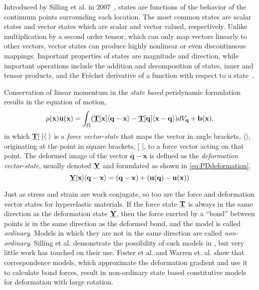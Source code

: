 \documentclass[11pt]{amsart}
\newcommand\vstate[3]{%
	\mathbf{\underline{#1}}%
	\ifstrempty{#2}{}{[#2]}%
	\ifstrempty{#3}{}{\langle #3 \rangle}}
\begin{document}
Introduced by Silling et al. in 2007~\cite{silling2007peridynamic}, states are functions of the behavior of the continuum points surrounding each location.
The most common states are scalar states and vector states which are scalar and vector valued, respectively.
Unlike multiplication by a second order tensor, which can only map vectors linearly to other vectors, vector states can produce highly nonlinear or even discontinuous mappings.
Important properties of states are magnitude and direction, while important operations include the addition and decomposition of states, inner and tensor products, and the Fr\'{e}chet derivative of a function with respect to a state~\cite{silling2007peridynamic}.

Conservation of linear momentum in the \textit{state based} peridynamic formulation results in the equation of motion,
%
\begin{equation}
\label{eq:PDstateEoM}
\rho(\mathbf{x})\ddot{\mathbf{u}}(\mathbf{x}) = \int_\Omega (\vstate{T}{\mathbf{x}}{\mathbf{q}-\mathbf{x}}-\vstate{T}{\mathbf{q}}{\mathbf{x}-\mathbf{q}}) dV_\mathbf{q}  + \mathbf{b}(\mathbf{x}),\notag
\end{equation}
%
in which $\vstate{T}{\;}{\;}$ is a \textit{force vector-state} that maps the vector in angle brackets, $\langle \rangle$, originating at the point in square brackets, [ ], to a force vector acting on that point.
The deformed image of the vector $\mathbf{q}-\mathbf{x}$ is defined as the \textit{deformation vector-state}, usually denoted $\vstate{Y}{}{}$ and formulated as shown in \cref{eq:PDdeformation}. 
%
\begin{equation}
\label{eq:PDdeformation}
\vstate{Y}{\mathbf{x}}{\mathbf{q}-\mathbf{x}} = (\mathbf{q}-\mathbf{x}) + (\mathbf{u}(\mathbf{q})-\mathbf{u}(\mathbf{x}))
\end{equation}
%

Just as stress and strain are work conjugate, so too are the force and deformation vector states for hyperelastic materials.
If the force state $\vstate{T}{}{}$ is always in the same direction as the deformation state $\vstate{Y}{}{}$, then the force exerted by a ``bond'' between points is in the same direction as the deformed bond, and the model is called \textit{ordinary}.  
Models in which they are not in the same direction are called \textit{non-ordinary}.
Silling et al. demonstrate the possibility of such models in \cite{silling2010peridynamic}, but very little work has touched on their use.
Foster et al. \cite{foster2010viscoplasticity} and Warren et. al. \cite{warren2009non} show that correspondence models, which approximate the deformation gradient and use it to calculate bond forces, result in non-ordinary state based constitutive models for deformation with large rotation.
%
\FloatBarrier
\end{document}
